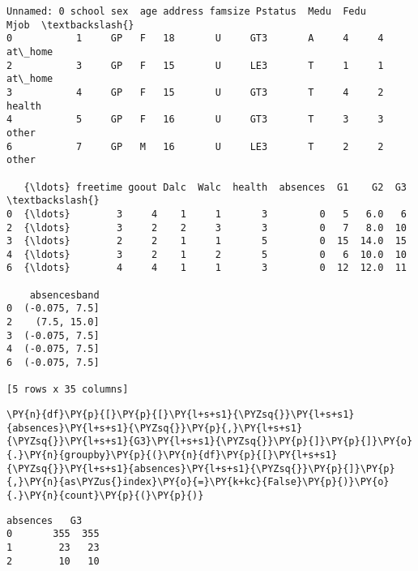             \begin{tcolorbox}[breakable, size=fbox, boxrule=.5pt, pad at break*=1mm, opacityfill=0]
\begin{Verbatim}[commandchars=\\\{\}]
   Unnamed: 0 school sex  age address famsize Pstatus  Medu  Fedu     Mjob  \textbackslash{}
0           1     GP   F   18       U     GT3       A     4     4  at\_home
2           3     GP   F   15       U     LE3       T     1     1  at\_home
3           4     GP   F   15       U     GT3       T     4     2   health
4           5     GP   F   16       U     GT3       T     3     3    other
6           7     GP   M   16       U     LE3       T     2     2    other

   {\ldots} freetime goout Dalc  Walc  health  absences  G1    G2  G3  \textbackslash{}
0  {\ldots}        3     4    1     1       3         0   5   6.0   6
2  {\ldots}        3     2    2     3       3         0   7   8.0  10
3  {\ldots}        2     2    1     1       5         0  15  14.0  15
4  {\ldots}        3     2    1     2       5         0   6  10.0  10
6  {\ldots}        4     4    1     1       3         0  12  12.0  11

    absencesband
0  (-0.075, 7.5]
2    (7.5, 15.0]
3  (-0.075, 7.5]
4  (-0.075, 7.5]
6  (-0.075, 7.5]

[5 rows x 35 columns]
\end{Verbatim}
\end{tcolorbox}
        
    \begin{tcolorbox}[breakable, size=fbox, boxrule=1pt, pad at break*=1mm,colback=cellbackground, colframe=cellborder]
\begin{Verbatim}[commandchars=\\\{\}]
\PY{n}{df}\PY{p}{[}\PY{p}{[}\PY{l+s+s1}{\PYZsq{}}\PY{l+s+s1}{absences}\PY{l+s+s1}{\PYZsq{}}\PY{p}{,}\PY{l+s+s1}{\PYZsq{}}\PY{l+s+s1}{G3}\PY{l+s+s1}{\PYZsq{}}\PY{p}{]}\PY{p}{]}\PY{o}{.}\PY{n}{groupby}\PY{p}{(}\PY{n}{df}\PY{p}{[}\PY{l+s+s1}{\PYZsq{}}\PY{l+s+s1}{absences}\PY{l+s+s1}{\PYZsq{}}\PY{p}{]}\PY{p}{,}\PY{n}{as\PYZus{}index}\PY{o}{=}\PY{k+kc}{False}\PY{p}{)}\PY{o}{.}\PY{n}{count}\PY{p}{(}\PY{p}{)}
\end{Verbatim}
\end{tcolorbox}

            \begin{tcolorbox}[breakable, size=fbox, boxrule=.5pt, pad at break*=1mm, opacityfill=0]
\begin{Verbatim}[commandchars=\\\{\}]
   absences   G3
0       355  355
1        23   23
2        10   10
\end{Verbatim}
\end{tcolorbox}
        
